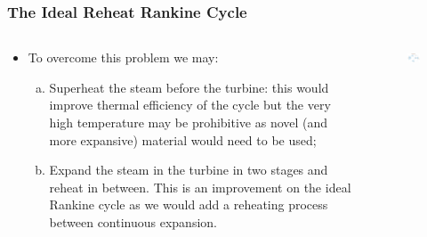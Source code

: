 \documentclass[10pt,compress]{beamer}
\begin{document}
\begin{frame}
 \frametitle{The Ideal Reheat Rankine Cycle}
  \begin{columns}
   \begin{column}[c]{0.5\linewidth}

 \begin{itemize} %
  \item <1-> To overcome this problem we may:
  \begin{enumerate}[(a)] %
   \item <2-> Superheat the steam before the turbine: this would improve thermal efficiency of the cycle but the very high temperature may be prohibitive as novel (and more expansive) material would need to be used;
   \item <3-> Expand the steam in the turbine in two stages and reheat in between. This is an improvement on the ideal Rankine cycle as we would add a reheating process between continuous expansion.
  \end{enumerate} 
 \end{itemize}
   \end{column}

   \begin{column}[c]{0.5\linewidth} 
    \begin{figure}%
     \begin{center}
      \includegraphics[width=6.25cm,clip]{./Pics/Reheat_Rankine_Cycle}
     \end{center}
    \end{figure}  
   \end{column}
  \end{columns}
 \normalsize
\end{frame}
\end{document}
